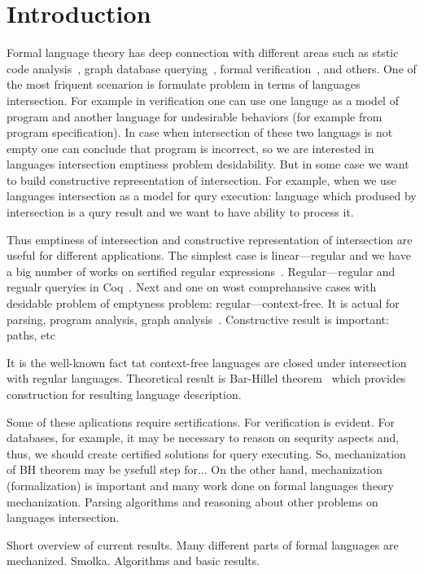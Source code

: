 \section{Introduction}

Formal language theory has deep connection with different areas such as ststic code analysis~\cite{!!!}, graph database querying~\cite{hellingsRelational, hellingsPathQuerying}, formal verification~\cite{!!!}, and others.
One of the most friquent scenarion is formulate problem in terms of languages intersection.
For example in verification one can use one languge as a model of program and another language for undesirable behaviors (for example from program specification).
In case when intersection of these two languags is not empty one can conclude that program is incorrect, so we are interested in languages intersection emptiness problem desidability.
But in some case we want to build constructive representation of intersection. 
For example, when we use languages intersection as a model for qury execution: language which prodused by intersection is a qury result and we want to have ability to process it.

Thus emptiness of intersection and constructive representation of intersection are useful for different applications.
The simplest case is linear---regular and we have a big number of works on sertified regular expressions~\cite{!!!}.
Regular---regular and regualr queryies in Coq~\cite{!!!}.
Next and one on wost comprehansive cases with desidable problem of emptyness problem: regular---context-free.
It is actual for parsing, program analysis, graph analysis~\cite{!!!}.
Constructive result is important: paths, etc

It is the well-known fact tat context-free languages are closed under intersection with regular languages. 
Theoretical result is Bar-Hillel theorem~\cite{bar1961formal} which provides construction for resulting language description.


Some of these aplications require sertifications. 
For verification is evident.
For databases, for example, it may be necessary to reason on sequrity aspects and, thus, we should create certified solutions for query executing.
So, mechanization of BH theorem may be ysefull step for...
On the other hand, mechanization (formalization) is important and many work done on formal languages theory mechanization. 
Parsing algorithms and reasoning about other problems on languages intersection.

Short overview of current results.
Many different parts of formal languages are mechanized. 
Smolka.
Algorithms and basic results.

